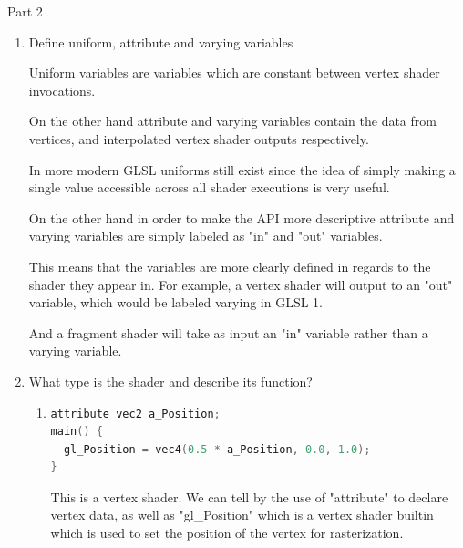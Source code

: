 \documentclass{article}
\begin{document}
    \break
    {\large Part 2}
    \begin{enumerate}
        \item Define uniform, attribute and varying variables
            \begin{mdframed}
                Uniform variables are variables which are
                constant between vertex shader invocations.

                On the other hand attribute and varying variables
                contain the data from vertices, and interpolated
                vertex shader outputs respectively.

                In more modern GLSL uniforms still exist since
                the idea of simply making a single value accessible
                across all shader executions is very useful.

                On the other hand in order to make the API more
                descriptive attribute and varying variables
                are simply labeled as "in" and "out" variables.

                This means that the variables are more clearly
                defined in regards to the shader they appear in.
                For example, a vertex shader will output to
                an "out" variable, which would be labeled
                varying in GLSL 1.

                And a fragment shader will take as input an
                "in" variable rather than a varying variable.
            \end{mdframed}

        \item What type is the shader and describe its function?
            \begin{enumerate}
                \item

                    \begin{lstlisting}[language=C]
attribute vec2 a_Position;
main() {
  gl_Position = vec4(0.5 * a_Position, 0.0, 1.0);
} 
                    \end{lstlisting}

                    \begin{mdframed}
                        This is a vertex shader. We can tell by
                        the use of "attribute" to declare vertex
                        data, as well as "gl\_Position" which
                        is a vertex shader builtin which
                        is used to set the position of the
                        vertex for rasterization.
                    \end{mdframed}


\end{enumerate}
\end{enumerate}
\end{document}
